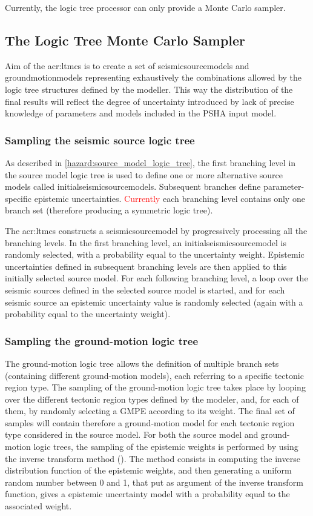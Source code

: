 Currently, the logic tree processor can only provide a Monte 
Carlo sampler.
%
\subsection{The Logic Tree Monte Carlo Sampler}
Aim of the \gls{acr:ltmcs} is to create a set of \glspl{seismicsourcemodel} 
and \glspl{groundmotionmodel} representing exhaustively the combinations 
allowed by the logic tree structures defined by the modeller.
% 
This way the distribution of the final results will reflect 
the degree of uncertainty introduced by lack of precise knowledge 
of parameters and models included in the PSHA input model.
%
\subsubsection{Sampling the seismic source logic tree}
As described in \ref{hazard:source_model_logic_tree}, the first branching 
level in the source model logic tree is used to define one or more 
alternative source models called \glspl{initialseismicsourcemodel}. 
%
Subsequent branches define parameter-specific epistemic uncertainties. 
\textcolor{red}{Currently} each branching level contains only one 
branch set (therefore producing a symmetric logic tree). 

The \gls{acr:ltmcs} constructs a \gls{seismicsourcemodel} by progressively
processing all the branching levels. In the first branching level, an 
\gls{initialseismicsourcemodel} is randomly selected, with a probability 
equal to the uncertainty 
weight. 
%
Epistemic uncertainties defined in subsequent branching levels are then 
applied to this initially selected source model. For each following 
branching level, a loop over the seismic sources defined in the selected
source model is started, and for each seismic source an epistemic 
uncertainty value is randomly selected (again with a probability equal to 
the uncertainty weight).
%
\subsubsection{Sampling the ground-motion logic tree}
The ground-motion logic tree allows the definition of multiple branch sets 
(containing different ground-motion models), each referring to a specific 
tectonic region type. 
%
The sampling of the ground-motion logic tree takes place by looping 
over the different tectonic region types defined by the modeler, and, for 
each of them, by randomly selecting a GMPE according to its weight. 
%
The final set of samples will contain therefore a ground-motion model for
each tectonic region type considered in the source model.
%
For both the source model and ground-motion logic trees, the sampling
of the epistemic weights is performed by using the inverse transform method (\citet{martinez2002}).
The method consists in computing the inverse distribution function of the epistemic weights,
and then generating a uniform random number between 0 and 1, that put as argument of the inverse transform function, gives a epistemic uncertainty model with a probability equal to the
associated weight.

